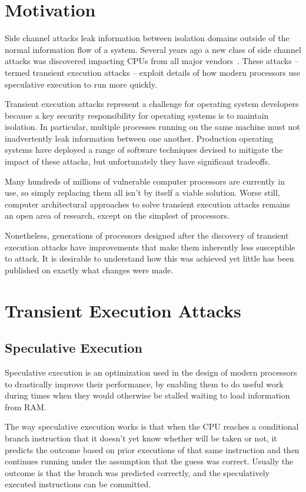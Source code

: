 \section*{Motivation}
Side channel attacks leak information between isolation domains outside of the normal information flow of a system.
Several years ago a new class of side channel attacks was discovered impacting CPUs from all major vendors~\cite{lipp:meltdown, kocher:spectre}.
These attacks -- termed transient execution attacks -- exploit details of how modern processors use speculative execution to run more quickly. 

Transient execution attacks represent a challenge for operating system developers because a key security responsibility for operating systems is to maintain isolation.
In particular, multiple processes running on the same machine must not inadvertently leak information between one another.
Production operating systems have deployed a range of software techniques devised to mitigate the impact of these attacks, but unfortunately they have significant tradeoffs.

Many hundreds of millions of vulnerable computer processors are currently in use, so simply replacing them all isn’t by itself a viable solution.
Worse still, computer architectural approaches to solve transient execution attacks remains an open area of research, except on the simplest of processors.

Nonetheless, generations of processors designed after the discovery of transient execution attacks have improvements that make them inherently less susceptible to attack.
It is desirable to understand how this was achieved yet little has been published on exactly what changes were made.

\section*{Transient Execution Attacks}
\subsection*{Speculative Execution}
Speculative execution is an optimization used in the design of modern processors to drastically improve their performance, by enabling them to do useful work during times when they would otherwise be stalled waiting to load information from RAM.

The way speculative execution works is that when the CPU reaches a conditional branch instruction that it doesn't yet know whether will be taken or not, it predicts the outcome based on prior executions of that same instruction and then continues running under the assumption that the guess was correct.
Usually the outcome is that the branch was predicted correctly, and the speculatively executed instructions can be committed.

